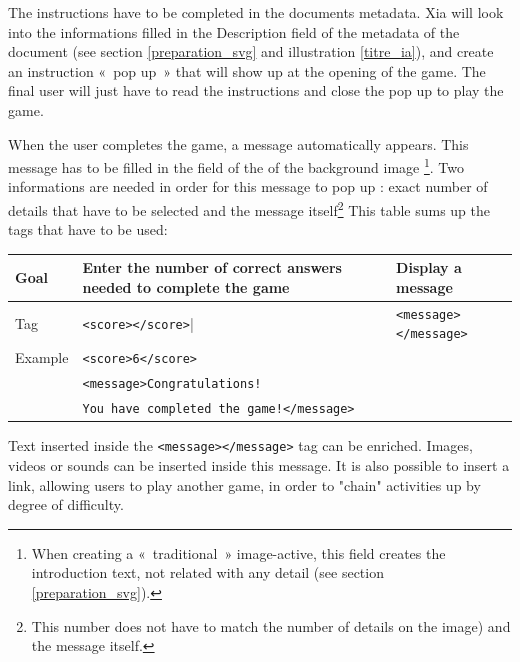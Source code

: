 The instructions have to be completed in the 
documents metadata. Xia will look into 
the informations  filled in the  \chemin
{Description} field of the metadata of the document (see section \ref{preparation_svg} and illustration \ref{titre_ia}), and create an instruction «~pop up~» 
that will show up at the opening of the game. The final user will just have to 
read the instructions and close the pop up to play the game.

When the user completes the game, a message automatically appears.  This message 
has to be filled in the  field of the  of the 
background image \footnote{When creating a «~traditional~» image-active, 
this field creates the introduction text, not related with any detail 
(see section \ref{preparation_svg}).}.  Two informations are needed in order for this message to pop up 
: exact number of details that have to be selected and the message itself\footnote{This number does 
not have to match the number of details on the image) 
and the message itself.} This table sums up the tags that have to be used:

 \begin{tabular}{|l|p{2in}|p{2in}|}
 \hline
  Goal & Enter the number of correct answers needed to complete the game & Display a message\\
  \hline
  Tag & \texttt{<score></score>}| & \texttt{<message></message>}\\
  \hline
  Example & \multicolumn{2}{|l|}{\texttt{<score>6</score>}}\\
   & \multicolumn{2}{|l|}{\texttt{<message>Congratulations!}}\\
    & \multicolumn{2}{|l|}{\texttt{You have completed the game!</message>}}\\
  \hline
 \end{tabular}


\begin{astuce}
Text inserted inside the \verb|<message></message>| tag can be 
enriched. Images, videos or sounds can be inserted inside this message.
It is also possible to insert a link, allowing users to play another game,
in order to "chain" activities up by degree of difficulty.
\end{astuce}

